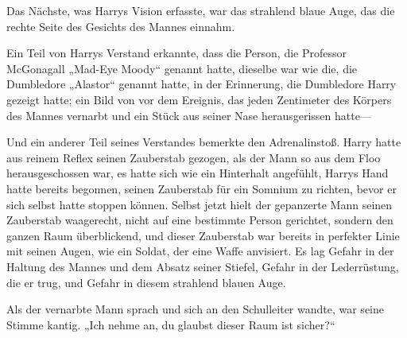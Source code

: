 Das Nächste, was Harrys Vision erfasste, war das strahlend blaue Auge, das die rechte Seite des Gesichts des Mannes einnahm.

Ein Teil von Harrys Verstand erkannte, dass die Person, die Professor McGonagall „Mad-Eye Moody“ genannt hatte, dieselbe war wie die, die Dumbledore „Alastor“ genannt hatte, in der Erinnerung, die Dumbledore Harry gezeigt hatte; ein Bild von vor dem Ereignis, das jeden Zentimeter des Körpers des Mannes vernarbt und ein Stück aus seiner Nase herausgerissen hatte—

Und ein anderer Teil seines Verstandes bemerkte den Adrenalinstoß. Harry hatte aus reinem Reflex seinen Zauberstab gezogen, als der Mann so aus dem Floo herausgeschossen war, es hatte sich wie ein Hinterhalt angefühlt, Harrys Hand hatte bereits begonnen, seinen Zauberstab für ein Somnium zu richten, bevor er sich selbst hatte stoppen können.
Selbst jetzt hielt der gepanzerte Mann seinen Zauberstab waagerecht, nicht auf eine bestimmte Person gerichtet, sondern den ganzen Raum überblickend, und dieser Zauberstab war bereits in perfekter Linie mit seinen Augen, wie ein Soldat, der eine Waffe anvisiert. Es lag Gefahr in der Haltung des Mannes und dem Absatz seiner Stiefel, Gefahr in der Lederrüstung, die er trug, und Gefahr in diesem strahlend blauen Auge.

Als der vernarbte Mann sprach und sich an den Schulleiter wandte, war seine Stimme kantig. „Ich nehme an, du glaubst dieser Raum ist sicher?“

